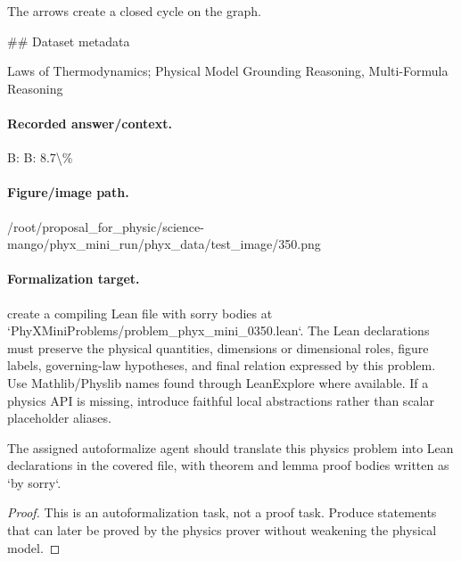 The arrows create a closed cycle on the graph.

\#\# Dataset metadata

Laws of Thermodynamics; Physical Model Grounding Reasoning, Multi-Formula Reasoning

\paragraph{Recorded answer/context.}
B: B: 8.7\textbackslash{}\%

\paragraph{Figure/image path.}
/root/proposal\_for\_physic/science-mango/phyx\_mini\_run/phyx\_data/test\_image/350.png

\paragraph{Formalization target.}
create a compiling Lean file with sorry bodies at `PhyXMiniProblems/problem\_phyx\_mini\_0350.lean`. The Lean declarations must preserve the physical quantities, dimensions or dimensional roles, figure labels, governing-law hypotheses, and final relation expressed by this problem.
Use Mathlib/Physlib names found through LeanExplore where available. If a physics API is missing, introduce faithful local abstractions rather than scalar placeholder aliases.

\begin{theorem}
\label{thm:physics:phyx_mini_0350:target}
The assigned autoformalize agent should translate this physics problem into Lean declarations in the covered file, with theorem and lemma proof bodies written as `by sorry`.
\end{theorem}
\begin{proof}
This is an autoformalization task, not a proof task. Produce statements that can later be proved by the physics prover without weakening the physical model.
\end{proof}

